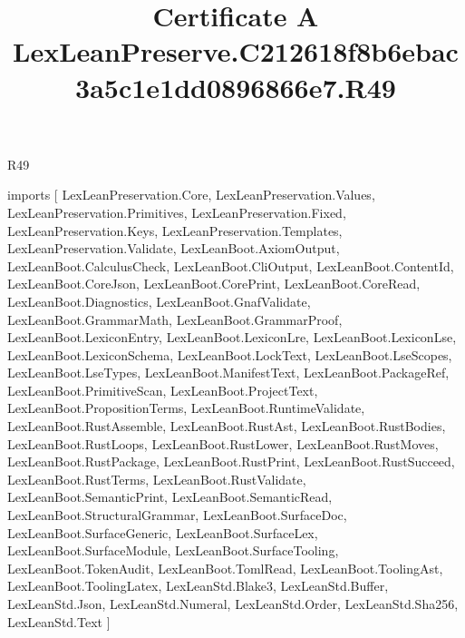 \begin{lexlean}{R49}
\title{Certificate A LexLeanPreserve.C212618f8b6ebac3a5c1e1dd0896866e7.R49}
\begin{coremodule}
imports [
  LexLeanPreservation.Core,
  LexLeanPreservation.Values,
  LexLeanPreservation.Primitives,
  LexLeanPreservation.Fixed,
  LexLeanPreservation.Keys,
  LexLeanPreservation.Templates,
  LexLeanPreservation.Validate,
  LexLeanBoot.AxiomOutput,
  LexLeanBoot.CalculusCheck,
  LexLeanBoot.CliOutput,
  LexLeanBoot.ContentId,
  LexLeanBoot.CoreJson,
  LexLeanBoot.CorePrint,
  LexLeanBoot.CoreRead,
  LexLeanBoot.Diagnostics,
  LexLeanBoot.GnafValidate,
  LexLeanBoot.GrammarMath,
  LexLeanBoot.GrammarProof,
  LexLeanBoot.LexiconEntry,
  LexLeanBoot.LexiconLre,
  LexLeanBoot.LexiconLse,
  LexLeanBoot.LexiconSchema,
  LexLeanBoot.LockText,
  LexLeanBoot.LseScopes,
  LexLeanBoot.LseTypes,
  LexLeanBoot.ManifestText,
  LexLeanBoot.PackageRef,
  LexLeanBoot.PrimitiveScan,
  LexLeanBoot.ProjectText,
  LexLeanBoot.PropositionTerms,
  LexLeanBoot.RuntimeValidate,
  LexLeanBoot.RustAssemble,
  LexLeanBoot.RustAst,
  LexLeanBoot.RustBodies,
  LexLeanBoot.RustLoops,
  LexLeanBoot.RustLower,
  LexLeanBoot.RustMoves,
  LexLeanBoot.RustPackage,
  LexLeanBoot.RustPrint,
  LexLeanBoot.RustSucceed,
  LexLeanBoot.RustTerms,
  LexLeanBoot.RustValidate,
  LexLeanBoot.SemanticPrint,
  LexLeanBoot.SemanticRead,
  LexLeanBoot.StructuralGrammar,
  LexLeanBoot.SurfaceDoc,
  LexLeanBoot.SurfaceGeneric,
  LexLeanBoot.SurfaceLex,
  LexLeanBoot.SurfaceModule,
  LexLeanBoot.SurfaceTooling,
  LexLeanBoot.TokenAudit,
  LexLeanBoot.TomlRead,
  LexLeanBoot.ToolingAst,
  LexLeanBoot.ToolingLatex,
  LexLeanStd.Blake3,
  LexLeanStd.Buffer,
  LexLeanStd.Json,
  LexLeanStd.Numeral,
  LexLeanStd.Order,
  LexLeanStd.Sha256,
  LexLeanStd.Text
]


\end{coremodule}
\end{lexlean}

